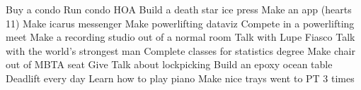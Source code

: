 Buy a condo
Run condo HOA
Build a death star ice press
Make an app (hearts 11)
Make icarus messenger
Make powerlifting dataviz
Compete in a powerlifting meet
Make a recording studio out of a normal room
Talk with Lupe Fiasco
Talk with the world's strongest man
Complete classes for statistics degree
Make chair out of MBTA seat
Give Talk about lockpicking
Build an epoxy ocean table
Deadlift every day
Learn how to play piano
Make nice trays
went to PT 3 times